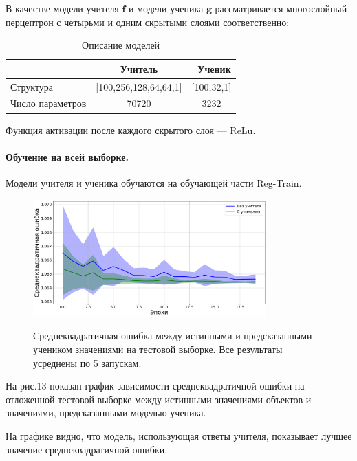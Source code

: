 В качестве модели учителя $\textbf{f}$ и модели ученика $\textbf{g}$ рассматривается многослойный перцептрон с четырьми и одним скрытыми слоями соответственно:

\begin{table}[h!t]
\begin{center}
\caption{Описание моделей}
\label{table_15}
\begin{tabular}{|c|c|c|}
\hline
	 & Учитель &\ Ученик\\
	\hline
	\multicolumn{1}{|l|}{Структура}
	& [100,256,128,64,64,1]& [100,32,1]\\
	\hline
	\multicolumn{1}{|l|}{Число параметров}
	& 70720 & 3232\\
\hline

\end{tabular}
\end{center}
\end{table}

Функция активации после каждого скрытого слоя --- ReLu.

\paragraph{Обучение на всей выборке.}
Модели учителя и ученика обучаются на обучающей части Reg-Train.

\begin{figure}[h!t]\center
{\includegraphics[width=0.8\textwidth]{results/reg_loss}}\\
\caption{Среднеквадратичная ошибка между истинными и предсказанными учеником значениями на тестовой выборке. Все результаты усреднены по 5 запускам.}
\end{figure}

На рис.13 показан график зависимости среднеквадратичной ошибки на отложенной тестовой выборке между истинными значениями объектов и значениями, предсказанными моделью ученика.

На графике видно, что модель, использующая ответы учителя, показывает лучшее значение среднеквадратичной ошибки.

